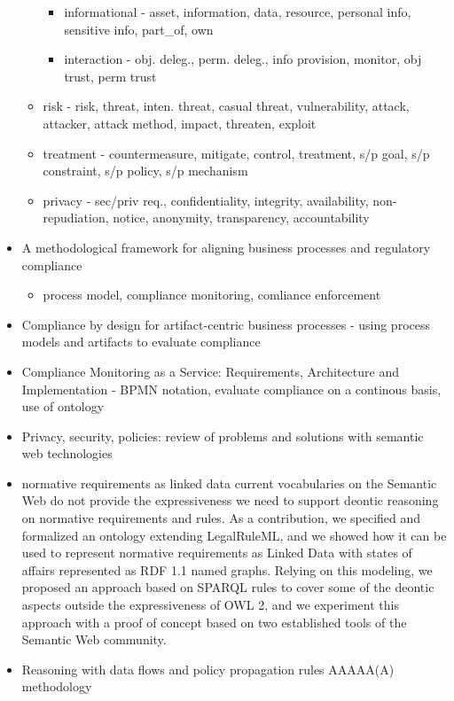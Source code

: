 \begin{itemize}
\begin{itemize}
\begin{itemize}
		\item informational - asset, information, data, resource, personal info, sensitive info, part\_of, own
		\item interaction - obj. deleg., perm. deleg., info provision, monitor, obj trust, perm trust
		\end{itemize}
	\item risk - risk, threat, inten. threat, casual threat, vulnerability, attack, attacker, attack method, impact, threaten, exploit
	\item treatment - countermeasure, mitigate, control, treatment, s/p goal, s/p constraint, s/p policy, s/p mechanism
	\item privacy - sec/priv req., confidentiality, integrity, availability, non-repudiation, notice, anonymity, transparency, accountability
	\end{itemize}
\item A methodological framework for aligning business processes and regulatory compliance
	\begin{itemize}
	\item process model, compliance monitoring, comliance enforcement
	\end{itemize}
\item Compliance by design for artifact-centric business processes - using process models and artifacts to evaluate compliance
\item Compliance Monitoring as a Service: Requirements, Architecture and Implementation - BPMN notation, evaluate compliance on a continous basis, use of ontology
\item Privacy, security, policies: review of problems and solutions with semantic web technologies \cite{kirrane_privacy_2018}
\item normative requirements as linked data \cite{gandon_normative_2017} current vocabularies on the Semantic Web do not provide the expressiveness we need to support deontic reasoning on normative
requirements and rules. As a contribution, we specified and formalized an ontology extending LegalRuleML, and we showed how it can be used to represent normative requirements as Linked Data with states of affairs represented as RDF 1.1 named graphs. Relying on this modeling, we proposed an approach based on SPARQL rules to cover some of the deontic aspects outside the expressiveness of OWL 2, and we experiment this approach with a proof of concept based on two established tools of the Semantic Web community.
\item Reasoning with data flows and policy propagation rules \cite{daga_reasoning_2017} AAAAA(A) methodology

\end{itemize}

